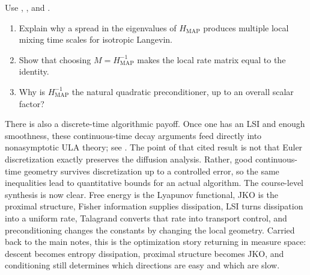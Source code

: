 \documentclass[11pt]{article}
\newif\ifshowsolutions
\newcommand{\SolutionBox}[2][10]{%
  \ifshowsolutions
    \begin{tcolorbox}[stat221panelgray,title={Solution}]
    #2
    \end{tcolorbox}
  \else
    \begin{tcolorbox}[stat221panelgray,unbreakable,title={Workspace}]
    \vspace{#1\baselineskip}
    \end{tcolorbox}
  \fi
}
\begin{document}
\begin{exercise}
\label{ex:logistic-preconditioner}
Use , , and .
\begin{enumerate}[leftmargin=*]
  \item Explain why a spread in the eigenvalues of $H_{\mathrm{MAP}}$ produces multiple local mixing time scales for isotropic Langevin.
  \item Show that choosing $M=H_{\mathrm{MAP}}^{-1}$ makes the local rate matrix equal to the identity.
  \item Why is $H_{\mathrm{MAP}}^{-1}$ the natural quadratic preconditioner, up to an overall scalar factor?
\end{enumerate}
\end{exercise}
\SolutionBox[14]{%
\begin{enumerate}[leftmargin=*]
  \item In the quadratic surrogate, isotropic Langevin corresponds to $M=I_d$, so the local rate matrix is just $H_{\mathrm{MAP}}$.
  Its eigenvalues are the mode-by-mode contraction rates.
  If those eigenvalues vary widely, some directions equilibrate quickly while others remain slow, creating multiple local time scales.
  \item By \Cref{prop:preconditioned-rate-matrix},
  \[
  A=M^{1/2}H_{\mathrm{MAP}}M^{1/2}.
  \]
  Setting $M=H_{\mathrm{MAP}}^{-1}$ gives
  \[
  A=H_{\mathrm{MAP}}^{-1/2}H_{\mathrm{MAP}}H_{\mathrm{MAP}}^{-1/2}=I_d.
  \]
  So all local contraction rates become $1$.
  \item If the goal is to equalize the quadratic modes, then we want $A$ to be proportional to the identity.
  That means
  \[
  M^{1/2}H_{\mathrm{MAP}}M^{1/2}=cI_d
  \]
  for some scalar $c>0$, which is equivalent to
  \[
  M=c\,H_{\mathrm{MAP}}^{-1}.
  \]
  Thus $H_{\mathrm{MAP}}^{-1}$ is the natural local quadratic preconditioner, with any extra scalar factor only changing the overall time scale.%
\end{enumerate}
}

There is also a discrete-time algorithmic payoff.
Once one has an LSI and enough smoothness, these continuous-time decay arguments feed directly into nonasymptotic ULA theory; see \citet[\S3.1, Thm.~1]{vempala_wibisono_2019_ula_isoperimetry}.
The point of that cited result is not that Euler discretization exactly preserves the diffusion analysis.
Rather, good continuous-time geometry survives discretization up to a controlled error, so the same inequalities lead to quantitative bounds for an actual algorithm.
The course-level synthesis is now clear.
Free energy is the Lyapunov functional, JKO is the proximal structure, Fisher information supplies dissipation, LSI turns dissipation into a uniform rate, Talagrand converts that rate into transport control, and preconditioning changes the constants by changing the local geometry.
Carried back to the main notes, this is the optimization story returning in measure space: descent becomes entropy dissipation, proximal structure becomes JKO, and conditioning still determines which directions are easy and which are slow.
\end{document}

